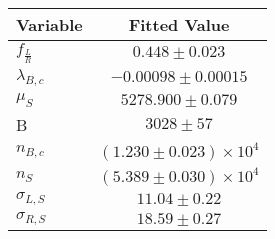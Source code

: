 \begin{tabular}[t]{lc}
\hline
Variable &Fitted Value\\
\hline\hline
$f_{\frac{L}{R}}$&$0.448\pm0.023$\\
\hline
$\lambda_{B,c}$&$-0.00098\pm0.00015$\\
\hline
$\mu_S$&$5278.900\pm0.079$\\
\hline
B&$3028\pm57$\\
\hline
$n_{B,c}$&$(1.230\pm0.023)\times 10^4$\\
\hline
$n_S$&$(5.389\pm0.030)\times 10^4$\\
\hline
$\sigma_{L, S}$&$11.04\pm0.22$\\
\hline
$\sigma_{R, S}$&$18.59\pm0.27$\\
\hline
\end{tabular}